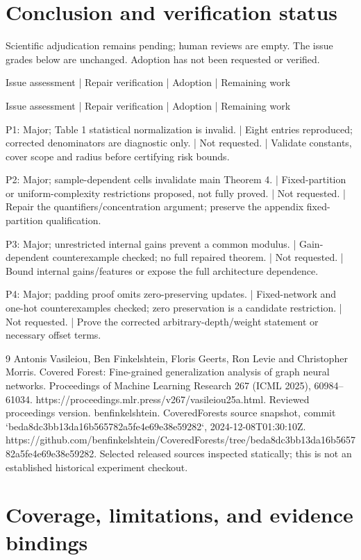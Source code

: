 \documentclass[10pt]{article}
\begin{document}
\section*{Conclusion and verification status}
Scientific adjudication remains pending; human reviews are empty. The issue grades below are unchanged. Adoption has not been requested or verified.\par
Issue assessment | Repair verification | Adoption | Remaining work\par
Issue assessment | Repair verification | Adoption | Remaining work\par
P1: Major; Table 1 statistical normalization is invalid. | Eight entries reproduced; corrected denominators are diagnostic only. | Not requested. | Validate constants, cover scope and radius before certifying risk bounds.\par
P2: Major; sample-dependent cells invalidate main Theorem 4. | Fixed-partition or uniform-complexity restrictions proposed, not fully proved. | Not requested. | Repair the quantifiers/concentration argument; preserve the appendix fixed-partition qualification.\par
P3: Major; unrestricted internal gains prevent a common modulus. | Gain-dependent counterexample checked; no full repaired theorem. | Not requested. | Bound internal gains/features or expose the full architecture dependence.\par
P4: Major; padding proof omits zero-preserving updates. | Fixed-network and one-hot counterexamples checked; zero preservation is a candidate restriction. | Not requested. | Prove the corrected arbitrary-depth/weight statement or necessary offset terms.\par
9 Antonis Vasileiou, Ben Finkelshtein, Floris Geerts, Ron Levie and Christopher Morris. Covered Forest: Fine-grained generalization analysis of graph neural networks. Proceedings of Machine Learning Research 267 (ICML 2025), 60984–61034. https://proceedings.mlr.press/v267/vasileiou25a.html. Reviewed proceedings version. benfinkelshtein. CoveredForests source snapshot, commit `beda8dc3bb13da16b565782a5fe4e69e38e59282`, 2024-12-08T01:30:10Z. https://github.com/benfinkelshtein/CoveredForests/tree/beda8dc3bb13da16b565782a5fe4e69e38e59282. Selected released sources inspected statically; this is not an established historical experiment checkout.\par
\section*{Coverage, limitations, and evidence bindings}
\end{document}
